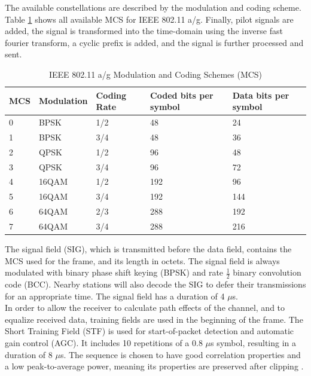 The available constellations are described by the modulation and coding scheme. Table \ref{tbl:mcs} shows all available MCS for IEEE 802.11 a/g. Finally, pilot signals are added, the signal is transformed into the time-domain using the inverse fast fourier transform, a cyclic prefix is added, and the signal is further processed and sent.

\begin{table}[ht]
	\begin{center}
		\begin{tabular}{|p{2.5cm}|p{2.5cm}|p{2.5cm}|p{2.5cm}|p{2.5cm}|}
			\hline
			\textbf{MCS} & \textbf{Modulation} & \textbf{Coding Rate} & \textbf{Coded bits per symbol} & \textbf{Data bits per symbol} \\ \hline
			0 & BPSK & 1/2 & 48 & 24 \\ \hline
			1 & BPSK & 3/4 & 48 & 36 \\ \hline
			2 & QPSK & 1/2 & 96 & 48 \\ \hline
			3 & QPSK & 3/4 & 96 & 72 \\ \hline
			4 & 16QAM & 1/2 & 192 & 96 \\ \hline
			5 & 16QAM & 3/4 & 192 & 144 \\ \hline
			6 & 64QAM & 2/3 & 288 & 192 \\ \hline
			7 & 64QAM & 3/4 & 288 & 216 \\ \hline
		\end{tabular}
	\end{center}
	\caption[IEEE 802.11 a/g Modulation and Coding Schemes (MCS)]{IEEE 802.11 a/g Modulation and Coding Schemes (MCS) \cite{NEEDED}}
	\label{tbl:mcs}
\end{table}

The signal field (SIG), which is transmitted before the data field, contains the MCS used for the frame, and its length in octets. The signal field is always modulated with binary phase shift keying (BPSK) and rate $\frac{1}{2}$ binary convolution code (BCC). Nearby stations will also decode the SIG to defer their transmissions for an appropriate time. The signal field has a duration of 4 $\mu$s.\\

In order to allow the receiver to calculate path effects of the channel, and to equalize received data, training fields are used in the beginning of the frame. The Short Training Field (STF) is used for start-of-packet detection and automatic gain control (AGC). It includes 10 repetitions of a 0.8 $\mu$s symbol, resulting in a duration of 8 $\mu$s. The sequence is chosen to have good correlation properties and a low peak-to-average power, meaning its properties are preserved after clipping \cite{perahia2013}.

